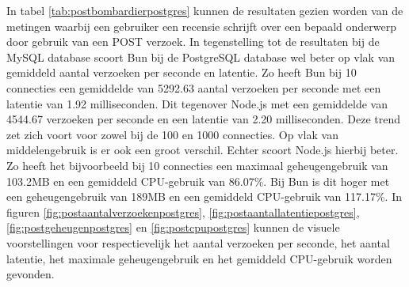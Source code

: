 In tabel \ref{tab:postbombardierpostgres} kunnen de resultaten gezien worden van de metingen waarbij 
een gebruiker een recensie schrijft over een bepaald onderwerp door gebruik van een POST verzoek.
In tegenstelling tot de resultaten bij de MySQL database scoort Bun bij de PostgreSQL database wel beter op vlak van gemiddeld aantal verzoeken per seconde en latentie.
Zo heeft Bun bij 10 connecties een gemiddelde van 5292.63 aantal verzoeken per seconde met een latentie van 1.92 milliseconden. 
Dit tegenover Node.js met een gemiddelde van 4544.67 verzoeken per seconde en een latentie van 2.20 milliseconden.
Deze trend zet zich voort voor zowel bij de 100 en 1000 connecties.
Op vlak van middelengebruik is er ook een groot verschil. Echter scoort Node.js hierbij beter.
 Zo heeft het bijvoorbeeld bij 10 connecties een maximaal geheugengebruik van 103.2MB en een gemiddeld CPU-gebruik van 86.07\%.
Bij Bun is dit hoger met een geheugengebruik van 189MB en een gemiddeld CPU-gebruik van 117.17\%.
In figuren \ref{fig:postaantalverzoekenpostgres}, \ref{fig:postaantallatentiepostgres}, \ref{fig:postgeheugenpostgres} en \ref{fig:postcpupostgres} kunnen de visuele voorstellingen 
voor respectievelijk het aantal verzoeken per seconde, het aantal latentie, het maximale geheugengebruik en het gemiddeld CPU-gebruik worden gevonden.
